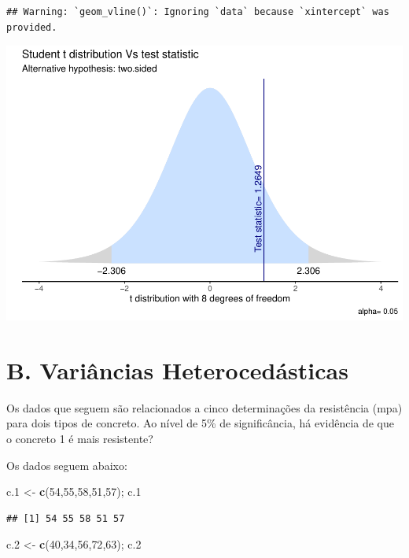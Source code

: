 \documentclass[
]{book}
\newenvironment{Shaded}{\begin{snugshade}}{\end{snugshade}}
\newcommand{\DecValTok}[1]{\textcolor[rgb]{0.00,0.00,0.81}{#1}}
\newcommand{\FloatTok}[1]{\textcolor[rgb]{0.00,0.00,0.81}{#1}}
\newcommand{\FunctionTok}[1]{\textcolor[rgb]{0.13,0.29,0.53}{\textbf{#1}}}
\newcommand{\NormalTok}[1]{#1}
\newcommand{\OtherTok}[1]{\textcolor[rgb]{0.56,0.35,0.01}{#1}}
\begin{document}
\begin{verbatim}
## Warning: `geom_vline()`: Ignoring `data` because `xintercept` was provided.
\end{verbatim}

\includegraphics{_main_files/figure-latex/graf-1.pdf}

\section{B. Variâncias Heterocedásticas}\label{b.-variuxe2ncias-heteroceduxe1sticas}

Os dados que seguem são relacionados a cinco determinações da resistência (mpa) para dois tipos de concreto.
Ao nível de 5\% de significância, há evidência de que o concreto 1 é mais resistente?

Os dados seguem abaixo:

\begin{Shaded}
\begin{Highlighting}[]
\NormalTok{c}\FloatTok{.1} \OtherTok{\textless{}{-}} \FunctionTok{c}\NormalTok{(}\DecValTok{54}\NormalTok{,}\DecValTok{55}\NormalTok{,}\DecValTok{58}\NormalTok{,}\DecValTok{51}\NormalTok{,}\DecValTok{57}\NormalTok{); c}\FloatTok{.1}
\end{Highlighting}
\end{Shaded}

\begin{verbatim}
## [1] 54 55 58 51 57
\end{verbatim}

\begin{Shaded}
\begin{Highlighting}[]
\NormalTok{c}\FloatTok{.2} \OtherTok{\textless{}{-}} \FunctionTok{c}\NormalTok{(}\DecValTok{40}\NormalTok{,}\DecValTok{34}\NormalTok{,}\DecValTok{56}\NormalTok{,}\DecValTok{72}\NormalTok{,}\DecValTok{63}\NormalTok{); c}\FloatTok{.2}
\end{Highlighting}
\end{Shaded}
\end{document}
